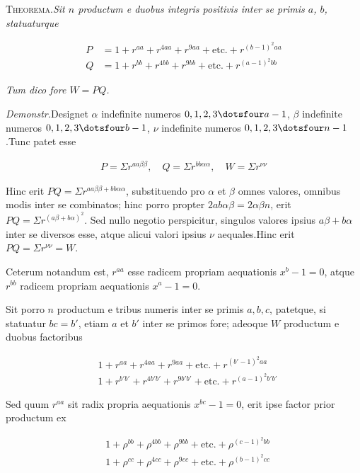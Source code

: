 
\textsc{Theorema.}\quad \textit{Sit $n$ productum e duobus integris positivis inter se primis $a$, $b$,} \textit{statuaturque}

\[
\begin{aligned}
P&=1+ r^{aa}+r^{4aa}+r^{9aa}+\text{etc.}+r^{(b-1)^2aa}\\
Q&=1+r^{bb}+r^{4bb}+r^{9bb}+\text{etc.}+r^{(a-1)^2bb}
\end{aligned}
\]

\textit{Tum dico fore $W=PQ$.}

\textit{Demonstr.}\quad Designet $\alpha$ indefinite numeros $0,1,2,3\dotsfour a-1$, $\beta$ indefinite numeros $0,1,2,3\dotsfour b-1$, $\nu$ indefinite numeros $0,1,2,3\dotsfour n-1$.\quad Tunc patet esse

\[
\begin{aligned}
P=\Sigma r^{aa\beta\beta},\quad Q=\Sigma r^{bb\alpha\alpha},\quad W=\Sigma r^{\nu\nu}
\end{aligned}
\]

Hinc erit $PQ=\Sigma r^{aa\beta\beta+bb\alpha\alpha}$, substituendo pro $\alpha$ et $\beta$ omnes valores, omnibus modis inter se combinatos; hinc porro propter $2ab\alpha\beta=2\alpha\beta n$, erit $PQ=\Sigma r^{(a\beta+b\alpha)^2}$. Sed nullo negotio perspicitur, singulos valores ipsius $a\beta+b\alpha$ inter se diversos esse, atque alicui valori ipsius $\nu$ aequales.\quad Hinc erit $PQ=\Sigma r^{\nu\nu}=W$.

Ceterum notandum est, $r^{aa}$ esse radicem propriam aequationis $x^b-1=0$, atque $r^{bb}$ radicem propriam aequationis $x^a-1=0$.



Sit porro $n$ productum e tribus numeris inter se primis $a,b,c$, patetque, si statuatur $bc=b'$, etiam $a$ et $b'$ inter se primos fore; adeoque $W$ productum e duobus factoribus

\[
\begin{aligned}
&1+r^{aa}+r^{4aa}+r^{9aa}+\text{etc.}+r^{(b'-1)^2aa}\\
&1+r^{b'b'}+r^{4b'b'}+r^{9b'b'}+\text{etc.}+r^{(a-1)^2b'b'}
\end{aligned}
\]

Sed quum $r^{aa}$ sit radix propria aequationis $x^{bc}-1=0$, erit ipse factor prior productum ex

\[
\begin{aligned}
&1+\rho^{bb}+\rho^{4bb}+\rho^{9bb}+\text{etc.}+\rho^{(c-1)^2bb}\\
&1+\rho^{cc}+\rho^{4cc}+\rho^{9cc}+\text{etc.}+\rho^{(b-1)^2cc}
\end{aligned}
\]


